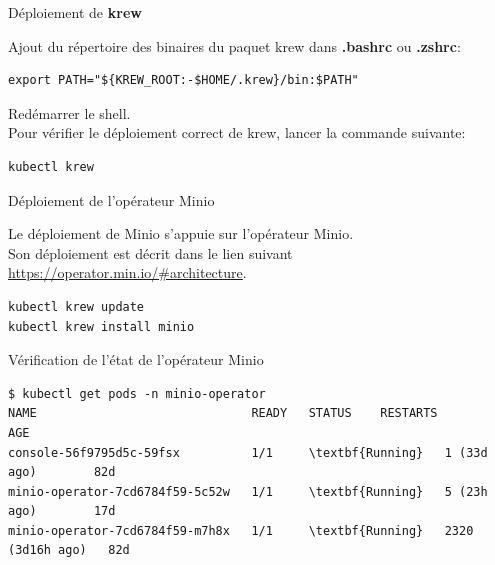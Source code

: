 
\begin{frame}[fragile]{Déploiement de \textbf{krew}}

   Ajout du répertoire des binaires du paquet krew dans \textbf{.bashrc} ou \textbf{.zshrc}:

\begin{tiny}
\begin{Verbatim}[commandchars=\&\#\#]
export PATH="${KREW_ROOT:-$HOME/.krew}/bin:$PATH"
\end{Verbatim}
\end{tiny}

Redémarrer le shell.\\
Pour vérifier le déploiement correct de krew, lancer la commande suivante:

\begin{tiny}
\begin{Verbatim}[commandchars=\&\#\#]
kubectl krew
\end{Verbatim}
\end{tiny}

\end{frame}


\begin{frame}[fragile]{Déploiement de l'opérateur Minio}

   Le déploiement de Minio s'appuie sur l'opérateur Minio.\\
   Son déploiement est décrit dans le lien suivant \url{https://operator.min.io/#architecture}.\\

\begin{tiny}
\begin{Verbatim}[commandchars=\&\#\#]
kubectl krew update
kubectl krew install minio
\end{Verbatim}
\end{tiny}


\end{frame}


\begin{frame}[fragile]{Vérification de l'état de l'opérateur Minio}

\begin{tiny}
\begin{Verbatim}[commandchars=\\\{\}]
$ kubectl get pods -n minio-operator
NAME                              READY   STATUS    RESTARTS           AGE
console-56f9795d5c-59fsx          1/1     \textbf{Running}   1 (33d ago)        82d
minio-operator-7cd6784f59-5c52w   1/1     \textbf{Running}   5 (23h ago)        17d
minio-operator-7cd6784f59-m7h8x   1/1     \textbf{Running}   2320 (3d16h ago)   82d
\end{Verbatim}
\end{tiny}

\end{frame}

